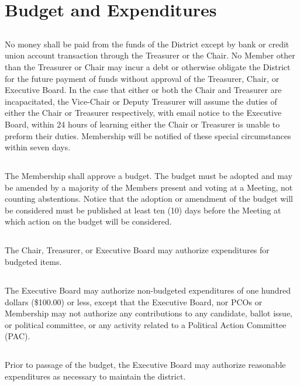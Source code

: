 \documentclass{article}
\newcommand{\fortythird}{\nth{43}}
\newcommand{\district}{\fortythird{} District}
\newcommand{\thedistrict}{the \district{}}
\begin{document}
\section{Budget and Expenditures}
\subsection{}
No money shall be paid from the funds of \thedistrict{} except by bank or credit union account transaction through the Treasurer or the Chair. No Member other than the Treasurer or Chair may incur a debt or otherwise obligate \thedistrict{} for the future payment of funds without approval of the Treasurer, Chair, or Executive Board. In the case that either or both the Chair and Treasurer are incapacitated, the Vice-Chair or Deputy Treasurer will assume the duties of either the Chair or Treasurer respectively, with email notice to the Executive Board, within 24 hours of learning either the Chair or Treasurer is unable to preform their duties. Membership will be notified of these special circumstances within seven days.

\subsection{}
The Membership shall approve a budget. The budget must be adopted and may be amended by a majority of the Members present and voting at a Meeting, not counting abstentions. Notice that the adoption or amendment of the budget will be considered must be published at least ten (10) days before the Meeting at which action on the budget will be considered.

\subsection{}
The Chair, Treasurer, or Executive Board may authorize expenditures for budgeted items.

\subsection{}
The Executive Board may authorize non-budgeted expenditures of one hundred dollars (\$100.00) or less, except that the Executive Board, nor PCOs or Membership may not authorize any contributions to any candidate, ballot issue, or political committee, or any activity related to a Political Action Committee (PAC).

\subsection{}
Prior to passage of the budget, the Executive Board may authorize reasonable expenditures as necessary to maintain the district.
\end{document}

